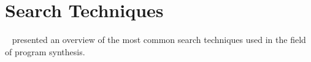 \section{Search Techniques}
\label{sec:search-techniques}


\citeauthor{Alur:sygus:2013}~\cite{Alur:sygus:2013} presented an overview of the
most common search techniques used in the field of program synthesis.









